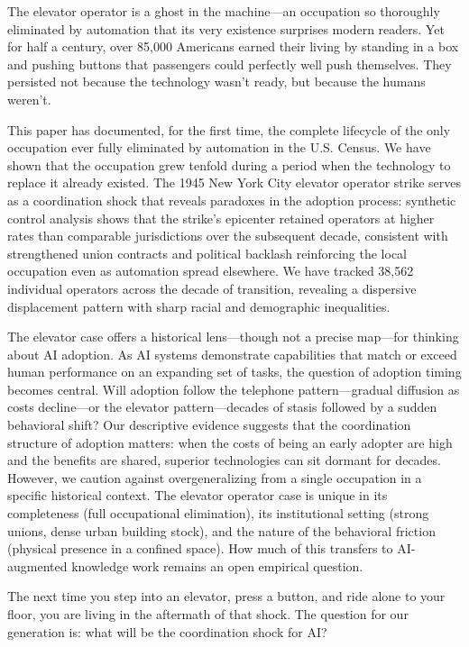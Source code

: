 \documentclass[12pt]{article}
\begin{document}
The elevator operator is a ghost in the machine---an occupation so thoroughly eliminated by automation that its very existence surprises modern readers. Yet for half a century, over 85,000 Americans earned their living by standing in a box and pushing buttons that passengers could perfectly well push themselves. They persisted not because the technology wasn't ready, but because the humans weren't.

This paper has documented, for the first time, the complete lifecycle of the only occupation ever fully eliminated by automation in the U.S. Census. We have shown that the occupation grew tenfold during a period when the technology to replace it already existed. The 1945 New York City elevator operator strike serves as a coordination shock that reveals paradoxes in the adoption process: synthetic control analysis shows that the strike's epicenter retained operators at higher rates than comparable jurisdictions over the subsequent decade, consistent with strengthened union contracts and political backlash reinforcing the local occupation even as automation spread elsewhere. We have tracked 38,562 individual operators across the decade of transition, revealing a dispersive displacement pattern with sharp racial and demographic inequalities.

The elevator case offers a historical lens---though not a precise map---for thinking about AI adoption. As AI systems demonstrate capabilities that match or exceed human performance on an expanding set of tasks, the question of adoption timing becomes central. Will adoption follow the telephone pattern---gradual diffusion as costs decline---or the elevator pattern---decades of stasis followed by a sudden behavioral shift? Our descriptive evidence suggests that the coordination structure of adoption matters: when the costs of being an early adopter are high and the benefits are shared, superior technologies can sit dormant for decades. However, we caution against overgeneralizing from a single occupation in a specific historical context. The elevator operator case is unique in its completeness (full occupational elimination), its institutional setting (strong unions, dense urban building stock), and the nature of the behavioral friction (physical presence in a confined space). How much of this transfers to AI-augmented knowledge work remains an open empirical question.

The next time you step into an elevator, press a button, and ride alone to your floor, you are living in the aftermath of that shock. The question for our generation is: what will be the coordination shock for AI?
\end{document}
